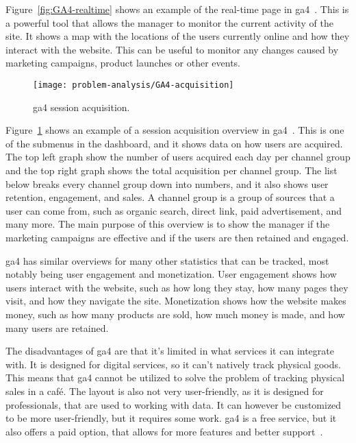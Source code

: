 Figure~\ref{fig:GA4-realtime} shows an example of the real-time page in \acrshort{ga4}~\cite{ga4-realtime}.
This is a powerful tool that allows the manager to monitor the current activity of the site.
It shows a map with the locations of the users currently online and how they interact with the website.
This can be useful to monitor any changes caused by marketing campaigns, product launches or other events.

\begin{figure}[H]
    \centering
    \texttt{[image: problem-analysis/GA4-acquisition]}
    \caption{\acrshort{ga4} session acquisition.}\label{fig:GA4-acquisition}
\end{figure}

Figure~\ref{fig:GA4-acquisition} shows an example of a session acquisition overview in \acrshort{ga4}~\cite{ga4-tips}.
This is one of the submenus in the dashboard, and it shows data on how users are acquired.
The top left graph show the number of users acquired each day per channel group and the top right graph shows the total
acquisition per channel group.
The list below breaks every channel group down into numbers, and it also shows user retention, engagement, and sales.
A channel group is a group of sources that a user can come from, such as organic search, direct link, paid
advertisement, and many more.
The main purpose of this overview is to show the manager if the marketing campaigns are effective and if the users are
then retained and engaged.

\acrshort{ga4} has similar overviews for many other statistics that can be tracked, most notably being user engagement
and monetization.
User engagement shows how users interact with the website, such as how long they stay, how many pages they visit, and
how they navigate the site.
Monetization shows how the website makes money, such as how many products are sold, how much money is made, and how
many users are retained.

The disadvantages of \acrlong{ga4} are that it's limited in what services it can integrate with.
It is designed for digital services, so it can't natively track physical goods.
This means that \acrshort{ga4} cannot be utilized to solve the problem of tracking physical sales in a caf\'e.
The layout is also not very user-friendly, as it is designed for professionals, that are used to working with data.
It can however be customized to be more user-friendly, but it requires some work.
\acrshort{ga4} is a free service, but it also offers a paid option, that allows for more features and better
support~\cite{ga4-360}.
